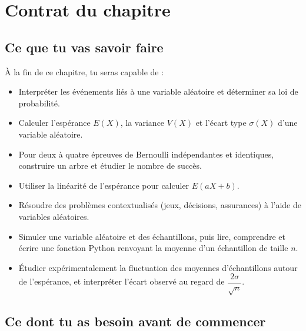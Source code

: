 
\section*{Contrat du chapitre}

\subsection*{Ce que tu vas savoir faire}

À la fin de ce chapitre, tu seras capable de :

\begin{itemize}
  \item[\textbf{C1}] Interpréter les événements liés à une variable aléatoire et déterminer sa loi de probabilité.
  \item[\textbf{C2}] Calculer l'espérance $E(X)$, la variance $V(X)$ et l'écart type $\sigma(X)$ d'une variable aléatoire.
  \item[\textbf{C3}] Pour deux à quatre épreuves de Bernoulli indépendantes et identiques, construire un arbre et étudier le nombre de succès.
  \item[\textbf{C4}] Utiliser la linéarité de l'espérance pour calculer $E(aX+b)$.
  \item[\textbf{C5}] Résoudre des problèmes contextualisés (jeux, décisions, assurances) à l'aide de variables aléatoires.
  \item[\textbf{C6}] Simuler une variable aléatoire et des échantillons, puis lire, comprendre et écrire une fonction Python renvoyant la moyenne d'un échantillon de taille $n$.
  \item[\textbf{C7}] Étudier expérimentalement la fluctuation des moyennes d'échantillons autour de l'espérance, et interpréter l'écart observé au regard de $\dfrac{2\sigma}{\sqrt{n}}$.
\end{itemize}

\subsection*{Ce dont tu as besoin avant de commencer}


